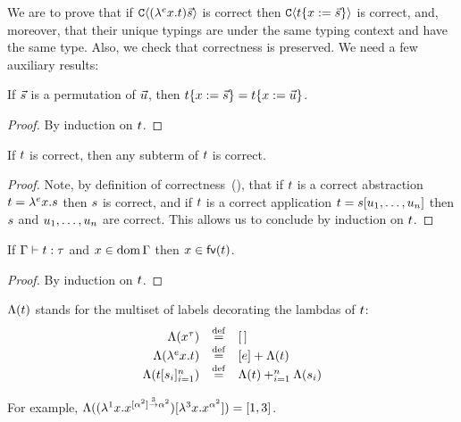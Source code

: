 We are to prove that
if $\mathtt{C}\langle(\lambda^{e} x. t)\vec{s}\rangle$ is correct
then $\mathtt{C}\langle t\{x := \vec{s}\}\rangle$ is correct,
and, moreover, that their unique typings are under the same typing context
and have the same type.
Also, we check that correctness is preserved.
We need a few auxiliary results:


\begin{lemma}
If $\vec{s}$ is a permutation of $\vec{u}$, then $t\{x := \vec{s}\} = t\{x := \vec{u}\}$.
\end{lemma}
\begin{proof}
By induction on $t$.
\end{proof}

\begin{lemma}
If $t$ is correct, then any subterm of $t$ is correct.
\end{lemma}
\begin{proof}
Note, by definition of correctness~(),
that if $t$ is a correct abstraction $t = \lambda^{e} x. s$ then $s$ is correct,
and if $t$ is a correct application $t = s[u_1,\hdots,u_n]$
then $s$ and $u_1,\hdots,u_n$ are correct.
This allows us to conclude by induction on $t$.
\end{proof}

\begin{lemma}[Relevance]
If $\Gamma \vdash t : \tau$
and $x \in \operatorname{dom}\Gamma$ then $x \in \mathsf{fv}({t})$.
\end{lemma}
\begin{proof}
By induction on $t$.
\end{proof}

\begin{definition}
$\Lambda(t)$ stands for the multiset of labels decorating the lambdas of $t$:
\[
  \begin{array}{rcl}
    \Lambda(x^\tau) & \overset{\mathrm{def}}{=} & [\,] \\
    \Lambda(\lambda^{e} x. t) & \overset{\mathrm{def}}{=} & [e] + \Lambda(t)  \\
    \Lambda(t[s_i]_{i=1}^{n}) & \overset{\mathrm{def}}{=} & \Lambda(t) +_{i=1}^{n} \Lambda(s_i)  \\
  \end{array}
\]
\end{definition}
For example, $\Lambda((\lambda^{1} x. x^{[\alpha^2] \overset{3}{\to} \alpha^2})[\lambda^{3} x. x^{\alpha^2}]) = [1,3]$.

